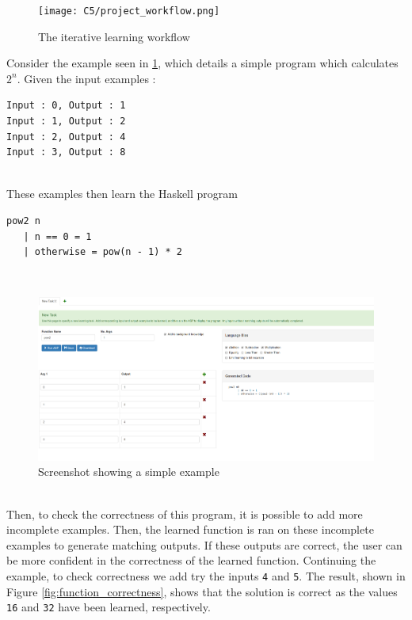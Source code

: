 \begin{figure}[h!]
\centering
\texttt{[image: C5/project\_workflow.png]}
\caption{The iterative learning workflow}
\end{figure}
Consider the example seen in \ref{fig:screenshot}, which details a simple program which calculates $2^n$. Given the input examples :\\
\begin{lstlisting}
Input : 0, Output : 1
Input : 1, Output : 2
Input : 2, Output : 4
Input : 3, Output : 8
\end{lstlisting}
\mbox{}\\
These examples then learn the Haskell program \\
\begin{lstlisting}
pow2 n
   | n == 0 = 1
   | otherwise = pow(n - 1) * 2
\end{lstlisting}
\mbox{}\\

\begin{figure}[h!]
\centering
\includegraphics[width=\textwidth]{C1/screenshot_pow2.png}
\caption{Screenshot showing a simple example}
\label{fig:screenshot}
\end{figure}
\mbox{}\\
Then, to check the correctness of this program, it is possible to add more incomplete examples. Then, the learned function is ran on these incomplete examples to generate matching outputs. If these outputs are correct, the user can be more confident in the correctness of the learned function. Continuing the example, to check correctness we add try the inputs \lstinline!4! and \lstinline!5!. The result, shown in Figure \ref{fig:function_correctness}, shows that the solution is correct as the values \lstinline!16! and \lstinline!32! have been learned, respectively.

